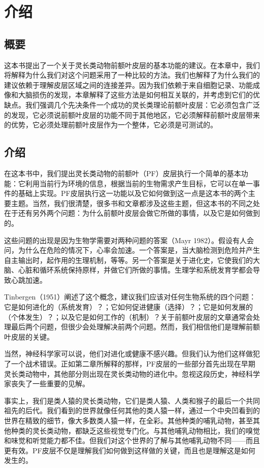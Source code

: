 

\chapter{介绍}

\section{概要}
这本书提出了一个关于灵长类动物前额叶皮层的基本功能的建议。在本章中，我们将解释为什么我们对这个问题采用了一种比较的方法。我们也解释了为什么我们的建议依赖于理解皮层区域之间的连接差异。因为我们依赖于来自细胞记录、功能成像和大脑损伤的发现，本章解释了这些方法是如何相互关联的，并考虑到它们的优缺点。我们强调几个先决条件一个成功的灵长类理论前额叶皮层：它必须包含广泛的发现，它必须说前额叶皮层的功能不同于其他地区，它必须解释前额叶皮层带来的优势，它必须处理前额叶皮层作为一个整体，它必须是可测试的。

\section{介绍}
在这本书中，我们提出灵长类动物的前额叶（PF）皮层执行一个简单的基本功能：它利用当前行为环境的信息，根据当前的生物需求产生目标，它可以在单一事件的基础上实现。PF皮层执行这一功能以及它如何做到这一点是这本书的两个主要主题。当然，我们很清楚，很多书和文章都涉及这些主题，但这本书的不同之处在于还有另外两个问题：为什么前额叶皮层会做它所做的事情，以及它是如何做到的。
\par 
这些问题的出现是因为生物学需要对两种问题的答案（Mayr 1982）。假设有人会问，为什么在危险的情况下，心率会加速。一个答案是，当大脑检测到危险并产生自主输出时，起作用的生理机制，等等。另一个答案是关于进化史，它使我们的大脑、心脏和循环系统保持原样，并做它们所做的事情。生理学和系统发育学都会导致心跳加速。
\par 
Tinbergen（1951）阐述了这个概念，建议我们应该对任何生物系统的四个问题：它是如何进化的（系统发育）？；它如何促进健康（选择）？；它是如何发展的（个体发生）？；以及它是如何工作的（机制）？关于前额叶皮层的文章通常会处理最后两个问题，但很少会处理解决前两个问题。然而，我们相信他们是理解前额叶皮层的关键。
\par 
当然，神经科学家可以说，他们对进化或健康不感兴趣。但我们认为他们这样做犯了一个战术错误。正如第二章所解释的那样，PF皮层的一些部分首先出现在早期灵长类动物中，其他部分则出现在灵长类动物的进化中。忽视这段历史，神经科学家丧失了一些重要的见解。
\par 
事实上，我们是类人猿的灵长类动物，它们是类人猿、人类和猴子的最后一个共同祖先的后代。我们看到的世界就像任何其他的类人猿一样，通过一个中央凹看到的世界在精致的细节，像大多数类人猿一样，在全彩。其他种类的哺乳动物，甚至其他种类的灵长类动物，都缺乏这些视觉专门化。与其他哺乳动物相比，我们的嗅觉和味觉和听觉能力都不佳。但我们对这个世界的了解与其他哺乳动物不同——而且更有效。PF皮层不仅是理解我们如何做到这样做的关键，而且也是理解这是如何发生的。

